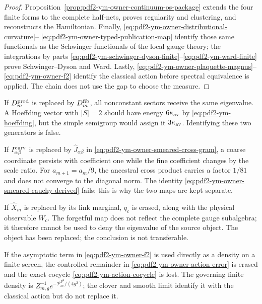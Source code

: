 \begin{proof}
Proposition~\ref{prop:pdf2-ym-owner-continuum-os-package} extends the
four finite forms to the
complete half-nets, proves regularity and clustering, and reconstructs the Hamiltonian.
Finally, \eqref{eq:pdf2-ym-owner-distributional-curvature}--
\eqref{eq:pdf2-ym-owner-typed-publication-map} identify those same functionals
as the Schwinger functionals of the local gauge theory; the integrations by parts
\eqref{eq:pdf2-ym-schwinger-dyson-finite}--\eqref{eq:pdf2-ym-ward-finite} prove
Schwinger--Dyson and Ward. Lastly,
\eqref{eq:pdf2-ym-owner-plaquette-magnus}--\eqref{eq:pdf2-ym-owner-f2} identify
the classical action before spectral equivalence is applied. The chain does not use the
gap to choose the measure.
\end{proof}

\begin{falsifier}
If $D_m^{\rm prod}$ is replaced by $D_m^{\rm fib}$, all nonconstant
sectors receive the same eigenvalue. A Hoeffding vector with $|S|=2$ should
have energy $6\kappa_{\rm av}$ by \eqref{eq:pdf2-ym-hoeffding}, but the
simple semigroup would assign it $3\kappa_{\rm av}$. Identifying these two
generators is false.
\end{falsifier}

\begin{falsifier}
If $I_{\alpha\beta}^{\rm curv}$ is replaced by
$\widehat J_{\alpha\beta}$ in
\eqref{eq:pdf2-ym-owner-smeared-cross-gram}, a coarse coordinate persists with
coefficient one while the fine coefficient changes by the scale ratio. For
$a_{m+1}=a_m/9$, the ancestral cross product carries a factor $1/81$ and does not converge
to the diagonal norm. The identity
\eqref{eq:pdf2-ym-owner-smeared-cauchy-derived} fails; this is why the two maps are
kept separate.
\end{falsifier}

\begin{falsifier}
If $\widehat X_m$ is replaced by its link marginal, $q_c$ is erased, along with
the physical observable $W_c$. The forgetful map does not reflect the complete gauge subalgebra;
it therefore cannot be used to deny the eigenvalue of the source object. The object
has been replaced; the conclusion is not transferable.
\end{falsifier}

\begin{falsifier}
If the asymptotic term in
\eqref{eq:pdf2-ym-owner-f2} is used directly as a density on a finite screen, the controlled
remainder in \eqref{eq:pdf2-ym-owner-action-error} is erased and the exact cocycle
\eqref{eq:pdf2-ym-action-cocycle} is lost. The governing finite density is
$Z_{m,g}^{-1}e^{-\mathcal P_m^{F^2}/(4g^2)}$; the clover and smooth limit
identify it with the classical action but do not replace it.
\end{falsifier}

